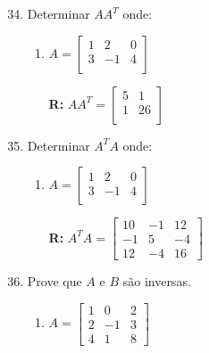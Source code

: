 \documentclass[oneside,a4paper,12pt]{article}
\begin{document}
\begin{enumerate}

	\setcounter{enumi}{33}

	\item Determinar $AA^T$ onde:
	\begin{multicols}{2}
	\begin{enumerate}
		\item $A=\left[
		\begin{array}{ccc}
		1	&	2	&	0	 \\
		3	&	-1	&	4	 \\
		\end{array}
		\right]
		$
		
		{\bf R:}
		$AA^T=\left[
		\begin{array}{cc}
		5	&	1	\\
		1	&	26	\\
		\end{array}
		\right]
		$
	\end{enumerate}
	\end{multicols}

	\item Determinar $A^TA$ onde:
	\begin{multicols}{2}
		\begin{enumerate}
			\item $A=\left[
			\begin{array}{ccc}
			1	&	2	&	0	 \\
			3	&	-1	&	4	 \\
			\end{array}
			\right]
			$
			
			{\bf R:}
			$A^TA=\left[
			\begin{array}{ccc}
			10	&	-1	&	12	\\
			-1	&	5	&	-4	\\
			12	&	-4	&	16
			\end{array}
			\right]
			$
		\end{enumerate}
	\end{multicols}


	\item Prove que $A$ e $B$ são inversas.
	\begin{multicols}{2}
	\begin{enumerate}
		\item $A=\left[
		\begin{array}{ccc}
		1	&	0	&	2	 \\
		2	&	-1	&	3	 \\
		4	&	1	&	8
		\end{array}
		\right]
		$
		

\end{enumerate}
\end{multicols}
\end{enumerate}
\end{document}
